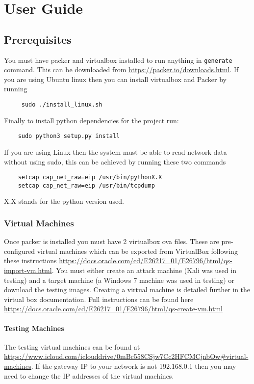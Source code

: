 \chapter{User Guide}
\section{Prerequisites}
You must have packer and virtualbox installed to run anything in \texttt{generate} command. This can be downloaded from \url{https://packer.io/downloads.html}. If you are using Ubuntu linux then you can install virtualbox and Packer by running
\begin{verbatim}
     sudo ./install_linux.sh
\end{verbatim}

Finally to install python dependencies for the project run:
\begin{verbatim}
    sudo python3 setup.py install
\end{verbatim}

If you are using Linux then the system must be able to read network data without using sudo, this can be achieved by running these two commands
\begin{verbatim}
    setcap cap_net_raw=eip /usr/bin/pythonX.X 
    setcap cap_net_raw=eip /usr/bin/tcpdump
\end{verbatim}
X.X stands for the python version used.

\subsection{Virtual Machines}
Once packer is installed you must have 2 virtualbox ova files. These are pre-configured virtual machines which can be exported from VirtualBox following these instructions \url{https://docs.oracle.com/cd/E26217_01/E26796/html/qs-import-vm.html}. You must either create an attack machine (Kali was used in testing) and a target machine (a Windows 7 machine was used in testing) or download the testing images. Creating a virtual machine is detailed further in the virtual box documentation. Full instructions can be found here \url{https://docs.oracle.com/cd/E26217_01/E26796/html/qs-create-vm.html}

\subsubsection{Testing Machines}

The testing virtual machines can be found at \url{https://www.icloud.com/iclouddrive/0mBc558CSjw7Cc2HFCMCjnbQw#virtual-machines}. If the gateway IP to your network is not 192.168.0.1 then you may need to change the IP addresses of the virtual machines.

